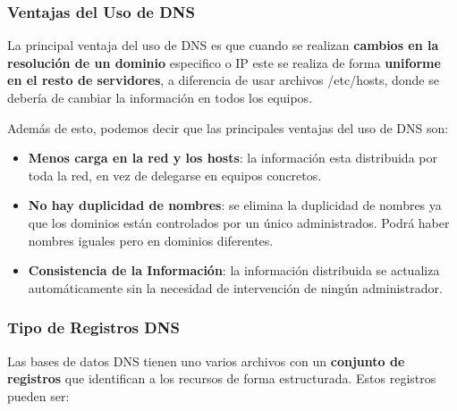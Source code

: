 \subsubsection{Ventajas del Uso de DNS}

    La principal ventaja del uso de DNS es que cuando se realizan \textbf{cambios en la resolución de un dominio} especifico o IP este se realiza de forma \textbf{uniforme en el resto de servidores}, a diferencia de usar archivos /etc/hosts, donde se debería de cambiar la información en todos los equipos.

    Además de esto, podemos decir que las principales ventajas del uso de DNS son:
    \begin{itemize}
        \item \textbf{Menos carga en la red y los hosts}: la información esta distribuida por toda la red, en vez de delegarse en equipos concretos.
        \item \textbf{No hay duplicidad de nombres}: se elimina la duplicidad de nombres ya que los dominios están controlados por un único administrados. Podrá haber nombres iguales pero en dominios diferentes.
        \item \textbf{Consistencia de la Información}: la información distribuida se actualiza automáticamente sin la necesidad de intervención de ningún administrador.
    \end{itemize}

\subsubsection{Tipo de Registros DNS}
Las bases de datos DNS tienen uno varios archivos con un \textbf{conjunto de registros} que identifican a los recursos de forma estructurada. Estos registros pueden ser:

